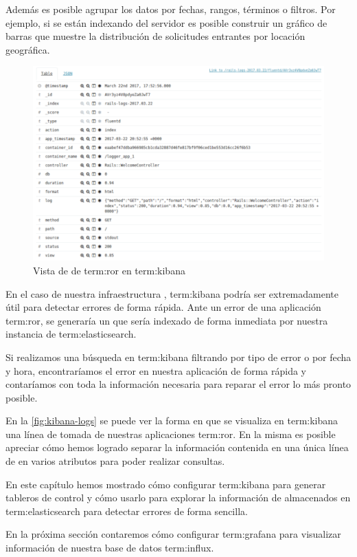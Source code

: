 Además es posible agrupar los datos por fechas, rangos, términos o filtros. Por
ejemplo, si se están indexando  del servidor es posible construir un
gráfico de barras que muestre la distribución de solicitudes 
entrantes por locación geográfica.

\begin{figure}
  \includegraphics[width=\linewidth]{src/images/05-capitulo-5/kibana-logs.png}
  \caption{Vista de  de \gls{term:ror} en \gls{term:kibana}}
  \label{fig:kibana-logs}
\end{figure}

En el caso de nuestra infraestructura , \gls{term:kibana} podría ser
extremadamente útil para detectar errores de forma rápida. Ante un error de una
aplicación \gls{term:ror}, se generaría un  que sería indexado de forma
inmediata por nuestra instancia de \gls{term:elasticsearch}.

Si realizamos una búsqueda en \gls{term:kibana} filtrando por tipo de error o
por fecha y hora, encontraríamos el error en nuestra aplicación de forma rápida
y contaríamos con toda la información necesaria para reparar el error lo más
pronto posible.

En la \autoref{fig:kibana-logs} se puede ver la forma en que se visualiza en
\gls{term:kibana} una línea de  tomada de nuestras aplicaciones
\gls{term:ror}. En la misma es posible apreciar cómo hemos logrado separar la
información contenida en una única línea de  en varios atributos para
poder realizar consultas.

En este capítulo hemos mostrado cómo configurar \gls{term:kibana} para generar
tableros de control y cómo usarlo para explorar la información de 
almacenados en \gls{term:elasticsearch} para detectar errores de forma sencilla.

En la próxima sección contaremos cómo configurar \gls{term:grafana} para
visualizar información de nuestra base de datos \gls{term:influx}.
